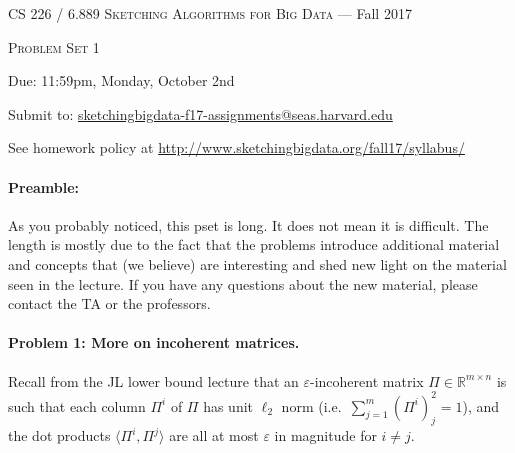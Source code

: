 \documentclass[12pt]{article}
\newcommand{\eps}{\varepsilon}
\newcommand{\R}{\mathbb{R}}
\newcommand{\inprod}[1]{\langle #1 \rangle}
\begin{document}
\thispagestyle{empty}

\begin{center}
{\Large \textsc{CS 226 / 6.889 Sketching Algorithms for Big Data} --- Fall 2017}

\bigskip

{\Large \textsc{Problem Set 1}}

\smallskip

Due: 11:59pm, Monday, October 2nd

Submit to: \url{sketchingbigdata-f17-assignments@seas.harvard.edu}

\bigskip

{\footnotesize See homework policy at \url{http://www.sketchingbigdata.org/fall17/syllabus/}}
\end{center}

\paragraph{Preamble:} As you probably noticed, this pset is long. It does not mean it is difficult. The length is mostly due to the fact that the problems introduce additional material and concepts that (we believe) are interesting and shed new light on the material seen in the lecture.  If you have any questions about the new material, please contact the TA or the professors. 

\paragraph{Problem 1: More on incoherent matrices.} Recall from the JL lower bound lecture that an $\eps$-incoherent matrix $\Pi\in\R^{m\times n}$ is such that each column $\Pi^i$ of $\Pi$ has unit $\ell_2$ norm (i.e.\ $\sum_{j=1}^m (\Pi^i)_j^2 = 1$), and the dot products $\inprod{\Pi^i, \Pi^j}$ are all at most $\eps$ in magnitude for $i\neq j$. 
\end{document}

